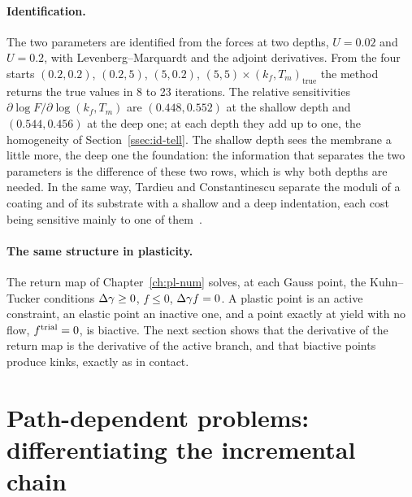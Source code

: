\paragraph{Identification.}
%
The two parameters are identified from the forces at two depths, $U=0.02$ and
$U=0.2$, with Levenberg--Marquardt and the adjoint derivatives. From the four
starts $(0.2,0.2)$, $(0.2,5)$, $(5,0.2)$, $(5,5)\times(k_f,T_m)_{\mathrm{true}}$ the
method returns the true values in 8 to 23 iterations. The relative sensitivities
$\partial\log F/\partial\log(k_f,T_m)$ are $(0.448,0.552)$ at the shallow depth and
$(0.544,0.456)$ at the deep one; at each depth they add up to one, the
homogeneity of Section~\ref{ssec:id-tell}. The shallow depth sees the membrane
a little more, the deep one the foundation: the information that separates the
two parameters is the difference of these two rows, which is why both depths
are needed. In the same way, Tardieu and Constantinescu separate the moduli of a
coating and of its substrate with a shallow and a deep indentation, each cost
being sensitive mainly to one of them~\cite{TardieuConstantinescu2000}.

\paragraph{The same structure in plasticity.}
%
The return map of Chapter~\ref{ch:pl-num} solves, at each Gauss point, the
Kuhn--Tucker conditions $\Delta\gamma\ge0$, $f\le0$, $\Delta\gamma f=0$. A plastic point is an
active constraint, an elastic point an inactive one, and a point exactly at yield
with no flow, $f^{\mathrm{trial}}=0$, is biactive. The next section shows that the
derivative of the return map is the derivative of the active branch, and that
biactive points produce kinks, exactly as in contact.

\section{Path-dependent problems: differentiating the incremental chain}\label{sec:id-path}
%
